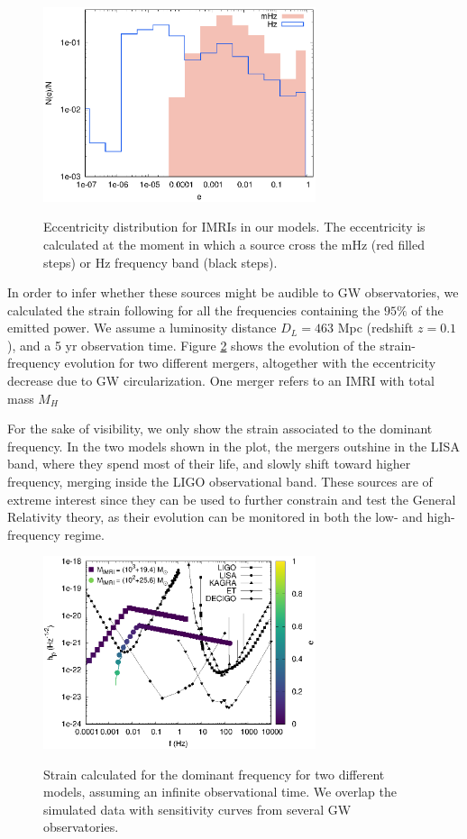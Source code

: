 \documentclass[useAMS,usenatbib]{mn2e}
\begin{document}
\begin{figure}
\centering
\includegraphics[width=8cm]{mergers_eccen}\\
\caption{Eccentricity distribution for IMRIs in our models. The eccentricity is calculated at the moment in which a source cross the mHz (red filled steps) or Hz frequency band (black steps).}
\label{F11}
\end{figure}

In order to infer whether these sources might be audible to GW observatories, we calculated the strain following \cite{kocsis12} for all the frequencies containing the $95\%$ of the emitted power. We assume a luminosity distance $D_L = 463$ Mpc (redshift $z=0.1$), and a 5 yr observation time. Figure \ref{F12} shows the evolution of the strain-frequency evolution for two different mergers, altogether with the eccentricity decrease due to GW circularization. One merger refers to an IMRI with total mass $M_H$

For the sake of visibility, we only show the strain associated to the dominant frequency. In the two models shown in the plot, the mergers outshine in the LISA band, where they spend most of their life, and slowly shift toward higher frequency, merging inside the LIGO observational band. These sources are of extreme interest since they can be used to further constrain and test the General Relativity theory, as their evolution can be monitored in both the low- and high-frequency regime. 

\begin{figure}
\centering
\includegraphics[width=8cm]{example_signal}\\
\caption{Strain calculated for the dominant frequency for two different models, assuming an infinite observational time. We overlap the simulated data with sensitivity curves from several GW observatories.}
\label{F12}
\end{figure}
\end{document}
